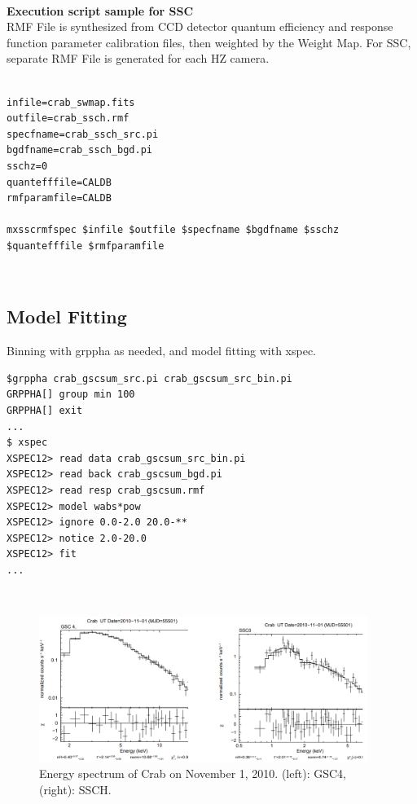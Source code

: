 \documentclass[10pt]{report}
\renewcommand{\_}{\textscale{.5}{\textbf{\textunderscore}}}
\begin{document}
\

\noindent\textbf{Execution script sample for SSC} \\

RMF File is synthesized from CCD detector quantum efficiency and response function parameter calibration files, then weighted by the Weight Map. For SSC, separate RMF File is generated for each HZ camera. \\

\begin{lstlisting}[frame=single]

infile=crab_swmap.fits
outfile=crab_ssch.rmf
specfname=crab_ssch_src.pi
bgdfname=crab_ssch_bgd.pi
sschz=0
quantefffile=CALDB
rmfparamfile=CALDB

mxsscrmfspec $infile $outfile $specfname $bgdfname $sschz $quantefffile $rmfparamfile

\end{lstlisting}

\

\subsection{Model Fitting}\label{subsec:4.4.4}

Binning with grppha as needed, and model fitting with xspec. \\

\begin{lstlisting}
$grppha crab_gscsum_src.pi crab_gscsum_src_bin.pi
GRPPHA[] group min 100
GRPPHA[] exit
...
$ xspec
XSPEC12> read data crab_gscsum_src_bin.pi
XSPEC12> read back crab_gscsum_bgd.pi
XSPEC12> read resp crab_gscsum.rmf
XSPEC12> model wabs*pow
XSPEC12> ignore 0.0-2.0 20.0-**
XSPEC12> notice 2.0-20.0
XSPEC12> fit
...
\end{lstlisting}

\

\begin{figure}[hbtp!]
  \centering
  \includegraphics[width=0.95\textwidth]{4_4.png}
  \caption{Energy spectrum of Crab on November 1, 2010. (left): GSC\_4, (right): SSC\_H.}
  \label{fig:4}
\end{figure}
\end{document}
